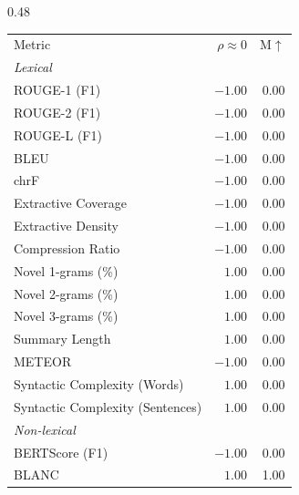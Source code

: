 \begin{table}[htbp]
\centering
\footnotesize
\setlength{\tabcolsep}{4pt}
\begin{subtable}[t]{0.48\textwidth}
\centering
\begin{tabular}{lrr}
 & & \\
\toprule
Metric & $\rho\approx0$ & M$\uparrow$\\
\midrule
\multicolumn{3}{l}{\textit{Lexical}} \\
\midrule
\rowcolor{matchFalse} ROUGE-1 (F1)                          &  $-1.00$ &  0.00 \\
\rowcolor{matchFalse} ROUGE-2 (F1)                          &  $-1.00$ &  0.00 \\
\rowcolor{matchFalse} ROUGE-L (F1)                          &  $-1.00$ &  0.00 \\
\rowcolor{matchFalse} BLEU                                  &  $-1.00$ &  0.00 \\
\rowcolor{matchFalse} chrF                                  &  $-1.00$ &  0.00 \\
\rowcolor{matchFalse} Extractive Coverage                   &  $-1.00$ &  0.00 \\
\rowcolor{matchFalse} Extractive Density                    &  $-1.00$ &  0.00 \\
\rowcolor{matchFalse} Compression Ratio                     &  $-1.00$ &  0.00 \\
\rowcolor{matchFalse} Novel 1-grams (\%)                    &   $1.00$ &  0.00 \\
\rowcolor{matchFalse} Novel 2-grams (\%)                    &   $1.00$ &  0.00 \\
\rowcolor{matchFalse} Novel 3-grams (\%)                    &   $1.00$ &  0.00 \\
\rowcolor{matchFalse} Summary Length                        &   $1.00$ &  0.00 \\
\rowcolor{matchFalse} METEOR                                &  $-1.00$ &  0.00 \\
\rowcolor{matchFalse} Syntactic Complexity (Words)          &   $1.00$ &  0.00 \\
\rowcolor{matchFalse} Syntactic Complexity (Sentences)      &   $1.00$ &  0.00 \\
\midrule
\multicolumn{3}{l}{\textit{Non-lexical}} \\
\midrule
\rowcolor{matchFalse} BERTScore (F1)                        &  $-1.00$ &  0.00 \\
\rowcolor{matchFalse} BLANC                                 &   $1.00$ &  1.00 \\

\end{tabular}
\end{subtable}
\end{table}
